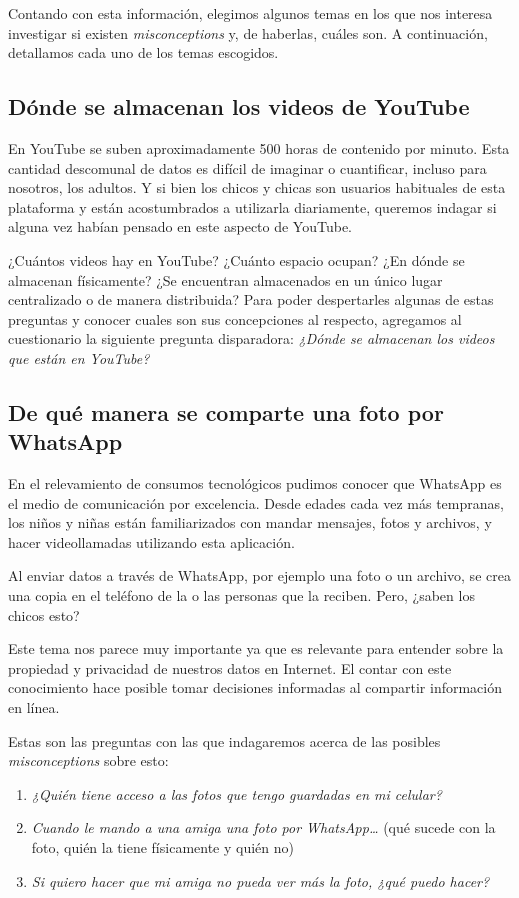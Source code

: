 Contando con esta información, elegimos algunos temas en los que nos interesa investigar si existen \textit{misconceptions} y, de haberlas, cuáles son. A continuación, detallamos cada uno de los temas escogidos.

\subsection{Dónde se almacenan los videos de YouTube}

En YouTube se suben aproximadamente 500 horas de contenido por minuto. Esta cantidad descomunal de datos es difícil de imaginar o cuantificar, incluso para nosotros, los adultos.  Y si bien los chicos y chicas son usuarios habituales de esta plataforma y están acostumbrados a utilizarla diariamente, queremos indagar si alguna vez habían pensado en este aspecto de YouTube.

¿Cuántos videos hay en YouTube? ¿Cuánto espacio ocupan? ¿En dónde se almacenan físicamente? ¿Se encuentran almacenados en un único lugar centralizado o de manera distribuida? Para poder despertarles algunas de estas preguntas y conocer cuales son sus concepciones al respecto, agregamos al cuestionario la siguiente pregunta disparadora: \textit{¿Dónde se almacenan los videos que están en YouTube?}

\subsection{De qué manera se comparte una foto por WhatsApp}

En el relevamiento de consumos tecnológicos pudimos conocer que WhatsApp es el medio de comunicación por excelencia. Desde edades cada vez más tempranas, los niños y niñas están familiarizados con mandar mensajes, fotos y archivos, y hacer videollamadas utilizando esta aplicación. 

Al enviar datos a través de WhatsApp, por ejemplo una foto o un archivo, se crea una copia en el teléfono de la o las personas que la reciben. Pero, ¿saben los chicos esto?

Este tema nos parece muy importante ya que es relevante para entender sobre la propiedad y privacidad de nuestros datos en Internet. El contar con este conocimiento hace posible tomar decisiones informadas al compartir información en línea.

Estas son las preguntas con las que indagaremos acerca de las posibles \textit{misconceptions} sobre esto:

\begin{enumerate}
    \item \textit{¿Quién tiene acceso a las fotos que tengo guardadas en mi celular?}
    \item \textit{Cuando le mando a una amiga una foto por WhatsApp… }(qué sucede con la foto, quién la tiene físicamente y quién no)
    \item \textit{Si quiero hacer que mi amiga no pueda ver más la foto, ¿qué puedo hacer?}
\end{enumerate}

